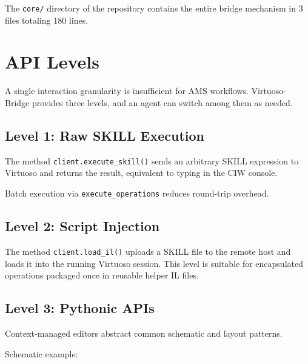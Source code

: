 \documentclass[lettersize,journal]{ieee_template/IEEEtran}
\begin{document}
The \texttt{core/} directory of the repository contains the entire bridge mechanism in 3 files totaling 180 lines.

\section{API Levels}

A single interaction granularity is insufficient for AMS workflows. Virtuoso-Bridge provides three levels, and an agent can switch among them as needed.

\subsection{Level 1: Raw SKILL Execution}
The method \texttt{client.execute\_skill()} sends an arbitrary SKILL expression to Virtuoso and returns the result, equivalent to typing in the CIW console.


Batch execution via \texttt{execute\_operations} reduces round-trip overhead.

\subsection{Level 2: Script Injection}
The method \texttt{client.load\_il()} uploads a SKILL file to the remote host and loads it into the running Virtuoso session. This level is suitable for encapsulated operations packaged once in reusable helper IL files.


\subsection{Level 3: Pythonic APIs}
Context-managed editors abstract common schematic and layout patterns.

Schematic example:
\end{document}

